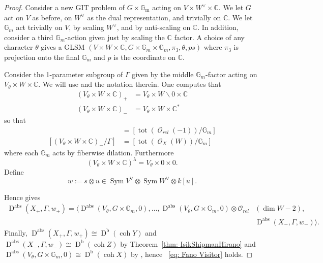 \documentclass[reqno, 12pt]{amsart}
\theoremstyle{definition}
\newcommand{\op}[1]{\operatorname{#1}}
\newcommand{\dbcoh}[1]{\operatorname{D}^{\operatorname{b}}(\operatorname{coh }#1)}
\newcommand{\dabs}{\op{D}^{\op{abs}}}
\newcommand{\gm}{\mathbb{G}_m}
\def\O{\op{\mathcal{O}}}
\def\Gm{\op{\mathbb{G}_m}}
\def\tot{\op{tot}}
\numberwithin{equation}{section}
\begin{document}
\begin{proof}
Consider a new GIT problem of $G \times \Gm$ acting on $V \times W^\vee \times \mathbb C$.  We let $G$ act on $V$ as before, on $W^\vee$ as the dual representation, and trivially on $\mathbb C$.  We let $\mathbb G_m$ act trivially on $V$, by scaling $W^\vee$, and by anti-scaling on $\mathbb C$.  In addition, consider a third $\mathbb G_m$-action given just by scaling the $\mathbb C$ factor.  A choice of any character $\theta$ gives a GLSM $(V \times W \times \mathbb C, G \times \mathbb G_m \times \mathbb G_m, \pi_3, \theta, ps)$ where $\pi_3$ is projection onto the final $\mathbb G_m$ and $p$ is the coordinate on $\mathbb C$.

Consider the 1-parameter subgroup of $\Gamma$ given by the middle $\gm$-factor acting on $V_\theta \times W \times \mathbb C$.
We will use \cite[Theorem 3.5.2]{VGIT} and the notation therein.
One computes that
\begin{align*}
(V_\theta \times W \times \mathbb C)_+ & = V_\theta \times W \backslash 0 \times \mathbb C \\
(V_\theta \times W \times \mathbb C)_- & = V_\theta \times W \times \mathbb C^*
\end{align*}
so that
\begin{align*}
[(V_\theta \times W \times \mathbb C)_+/\Gamma] & = [\tot(\O_{rel}(-1))/\gm] \\
[(V_\theta \times W \times \mathbb C)_-/\Gamma] & = [\tot(\O_X(W))/\gm]     
\end{align*}
where each $\gm$ acts by fiberwise dilation.
Furthermore
\[
(V_\theta \times W \times \mathbb C)^{\lambda} = V_\theta \times 0 \times 0.
\]
Define
\[
w := s \otimes u \in \op{Sym}V^\vee \otimes\op{Sym}W^\vee \otimes k[u]. 
\]

Hence \cite[Theorem 3.5.2]{VGIT} gives
\begin{align*}
\dabs(X_+, \Gamma, w_+) = \langle \dabs(V_\theta, G \times \gm, 0), \dots, \dabs(V_\theta, G \times \gm, 0) \otimes \mathcal O_{rel}&(\dim W-2), \\ &\dabs(X_-, \Gamma, w_-)\rangle.
\end{align*}
Finally, $\dabs(X_+, \Gamma, w_+) \cong \dbcoh{Y}$ and $\dabs(X_-, \Gamma, w_-) \cong \dbcoh{Z}$ by Theorem~\ref{thm: IsikShipmanHirano} and $\dabs(V_\theta, G \times \mathbb G_m, 0) \cong \dbcoh{X}$ by \cite[Proposition 2.1.6]{HPD}, hence ~\eqref{eq: Fano Visitor} holds.


\end{proof}
\end{document}
